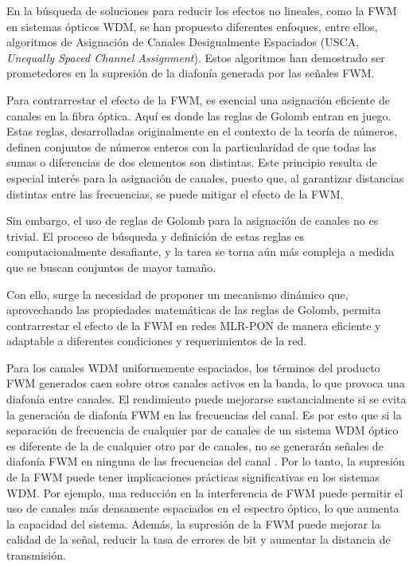 En la búsqueda de soluciones para reducir los efectos no lineales, como la FWM en sistemas ópticos WDM, se han propuesto diferentes enfoques, entre ellos, algoritmos de Asignación de Canales Desigualmente Espaciados (USCA, \textit{Unequally Spaced Channel Assignment}). Estos algoritmos han demostrado ser prometedores en la supresión de la diafonía generada por las señales FWM. 

Para contrarrestar el efecto de la FWM, es esencial una asignación eficiente de canales en la fibra óptica. Aquí es donde las reglas de Golomb entran en juego. Estas reglas, desarrolladas originalmente en el contexto de la teoría de números, definen conjuntos de números enteros con la particularidad de que todas las sumas o diferencias de dos elementos son distintas. Este principio resulta de especial interés para la asignación de canales, puesto que, al garantizar distancias distintas entre las frecuencias, se puede mitigar el efecto de la FWM.

Sin embargo, el uso de reglas de Golomb para la asignación de canales no es trivial. El proceso de búsqueda y definición de estas reglas es computacionalmente desafiante, y la tarea se torna aún más compleja a medida que se buscan conjuntos de mayor tamaño.

Con ello, surge la necesidad de proponer un mecanismo dinámico que, aprovechando las propiedades matemáticas de las reglas de Golomb, permita contrarrestar el efecto de la FWM en redes MLR-PON de manera eficiente y adaptable a diferentes condiciones y requerimientos de la red.

Para los canales WDM uniformemente espaciados, los términos del producto FWM generados caen sobre otros canales activos en la banda, lo que provoca una diafonía entre canales. El rendimiento puede mejorarse sustancialmente si se evita la generación de diafonía FWM en las frecuencias del canal. Es por esto que si la separación de frecuencia de cualquier par de canales de un sistema WDM óptico es diferente de la de cualquier otro par de canales, no se generarán señales de diafonía FWM en ninguna de las frecuencias del canal \cite{Bansal}. Por lo tanto, la supresión de la FWM puede tener implicaciones prácticas significativas en los sistemas WDM. Por ejemplo, una reducción en la interferencia de FWM puede permitir el uso de canales más densamente espaciados en el espectro óptico, lo que aumenta la capacidad del sistema. Además, la supresión de la FWM puede mejorar la calidad de la señal, reducir la tasa de errores de bit y aumentar la distancia de transmisión.



